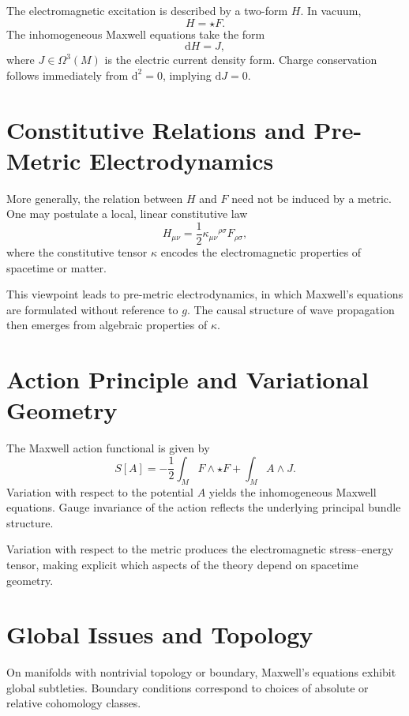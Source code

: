 \documentclass[11pt]{article}
\begin{document}
The electromagnetic excitation is described by a two-form $H$. In vacuum,
\begin{equation}
H = \star F.
\end{equation}
The inhomogeneous Maxwell equations take the form
\begin{equation}
\mathrm{d}H = J,
\end{equation}
where $J \in \Omega^3(M)$ is the electric current density form. Charge conservation follows immediately from $\mathrm{d}^2 = 0$, implying $\mathrm{d}J = 0$.

\section{Constitutive Relations and Pre-Metric Electrodynamics}
More generally, the relation between $H$ and $F$ need not be induced by a metric. One may postulate a local, linear constitutive law
\begin{equation}
H_{\mu\nu} = \frac{1}{2} \kappa_{\mu\nu}{}^{\rho\sigma} F_{\rho\sigma},
\end{equation}
where the constitutive tensor $\kappa$ encodes the electromagnetic properties of spacetime or matter.

This viewpoint leads to pre-metric electrodynamics, in which Maxwell's equations are formulated without reference to $g$. The causal structure of wave propagation then emerges from algebraic properties of $\kappa$.

\section{Action Principle and Variational Geometry}
The Maxwell action functional is given by
\begin{equation}
S[A] = -\frac{1}{2} \int_M F \wedge \star F + \int_M A \wedge J.
\end{equation}
Variation with respect to the potential $A$ yields the inhomogeneous Maxwell equations. Gauge invariance of the action reflects the underlying principal bundle structure.

Variation with respect to the metric produces the electromagnetic stress--energy tensor, making explicit which aspects of the theory depend on spacetime geometry.

\section{Global Issues and Topology}
On manifolds with nontrivial topology or boundary, Maxwell's equations exhibit global subtleties. Boundary conditions correspond to choices of absolute or relative cohomology classes.
\end{document}
